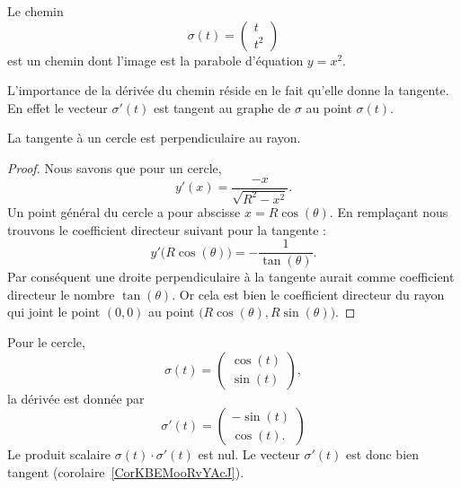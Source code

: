 \begin{example}
	Le chemin
	\begin{equation}
		\sigma(t)=\begin{pmatrix}
			t \\
			t^2
		\end{pmatrix}
	\end{equation}
	est un chemin dont l'image est la parabole d'équation \( y=x^2\).
\end{example}

L'importance de la dérivée du chemin réside en le fait qu'elle donne la tangente. En effet le vecteur \( \sigma'(t)\) est tangent au graphe de \( \sigma\) au point \( \sigma(t)\).

\begin{corollary}       \label{CorKBEMooRvYAcJ}
	La tangente à un cercle est perpendiculaire au rayon.
\end{corollary}

\begin{proof}
	Nous savons que pour un cercle,
	\begin{equation}
		y'(x)=\frac{ -x }{ \sqrt{R^2-x^2} }.
	\end{equation}
	Un point général du cercle a pour abscisse \( x=R\cos(\theta)\). En remplaçant nous trouvons le coefficient directeur suivant pour la tangente :
	\begin{equation}
		y'\big( R\cos(\theta) \big)=-\frac{1}{ \tan(\theta) }.
	\end{equation}
	Par conséquent une droite perpendiculaire à la tangente aurait comme coefficient directeur le nombre \( \tan(\theta)\). Or cela est bien le coefficient directeur du rayon qui joint le point \( (0,0)\) au point \( \big( R\cos(\theta),R\sin(\theta) \big)\).

\end{proof}

\begin{example}		\label{EXooQSFMooQEqcaC}
	Pour le cercle,
	\begin{equation}
		\sigma(t)=\begin{pmatrix}
			\cos(t) \\
			\sin(t)
		\end{pmatrix},
	\end{equation}
	la dérivée est donnée par
	\begin{equation}
		\sigma'(t)=\begin{pmatrix}
			-\sin(t) \\
			\cos(t).
		\end{pmatrix}
	\end{equation}
	Le produit scalaire \( \sigma(t)\cdot \sigma'(t)\) est nul. Le vecteur \( \sigma'(t)\) est donc bien tangent (corolaire~\ref{CorKBEMooRvYAcJ}).
\end{example}

